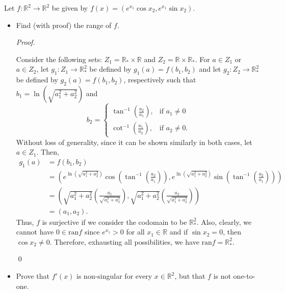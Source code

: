 \documentclass[12pt]{article}
\newenvironment{problem}[2][Problem]{\begin{trivlist}
\item[\hskip \labelsep {\bfseries #1}\hskip \labelsep {\bfseries
#2.}]}{\end{trivlist}}
\newenvironment{sol}
    {\emph{Proof.}
    }
    {
    \qed
    }
\begin{document}
  
  \begin{problem}{26}
  Let $f : \mathbb{R}^2 \to \mathbb{R}^2$ be given by $f(x) = (e^{x_1}\cos x_2,e^{x_1}\sin x_2).$ \begin{itemize}
      \item[(a)] Find (with proof) the range of $f$.
      
      \begin{sol}
      Consider the following sets: $Z_1 = \mathbb{R}_* \times \mathbb{R}$ and $Z_2 = \mathbb{R} \times \mathbb{R}_*$. For $a \in Z_1$ or $a \in Z_2$, let $g_1 : Z_1 \to \mathbb{R}_*^2$ be defined by $g_1(a) = f(b_1,b_2)$ and let $g_2 : Z_2 \to \mathbb{R}_*^2$ be defined by $g_2(a) = f(b_1,b_2)$, respectively such that $b_1 = \ln \left( \sqrt{a_1^2 + a_2^2} \right)$ and $$b_2 = \begin{cases} 
        \tan^{-1} \left( \frac{a_2}{a_1} \right), & \text{if } a_1 \neq 0 \\
        \cot^{-1}\left( \frac{a_1}{a_2} \right), & \text{if } a_2 \neq 0.
     \end{cases}$$
     \hspace{1em} Without loss of generality, since it can be shown similarly in both cases, let $a \in Z_1$. Then, \begin{align*}
         g_1(a) &= f(b_1,b_2) \\ 
         &= \left( e^{\ln \left( \sqrt{a_1^2 + a_2^2} \right)}\cos \left( \tan^{-1} \left( \frac{a_2}{a_1} \right) \right), e^{\ln \left( \sqrt{a_1^2 + a_2^2} \right)}\sin \left( \tan^{-1} \left( \frac{a_2}{a_1} \right) \right) \right)\\ 
         &= \left( \sqrt{a_1^2 + a_2^2} \left( \frac{a_1}{\sqrt{a_1^2 + a_2^2}} \right) , \sqrt{a_1^2 + a_2^2} \left( \frac{a_2}{\sqrt{a_1^2 + a_2^2}} \right) \right) \\ 
         &= (a_1,a_2).
     \end{align*}
     Thus, $f$ is surjective if we consider the codomain to be $\mathbb{R}_*^2$. 
     Also, clearly, we cannot have $0 \in \text{ran}f$ since $e^{x_1} > 0$ for all $x_1 \in \mathbb{R}$ and if $\sin x_2 = 0$, then $\cos x_2 \neq 0$. Therefore, exhausting all possibilities, we have $\text{ran}f = \mathbb{R}_*^2$.
      \end{sol}
      
      \item[(b)] Prove that $f'(x)$ is non-singular for every $x \in \mathbb{R}^2$, but that $f$ is not one-to-one.
      

\end{itemize}
\end{problem}
\end{document}
